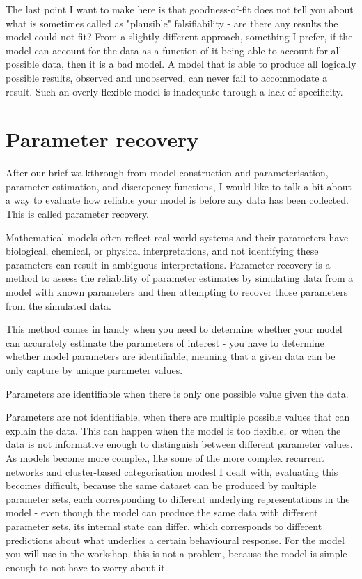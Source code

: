 \documentclass[12pt]{article}
\begin{document}
The last point I want to make here is that goodness-of-fit does not tell you about what is sometimes called as "plausible" falsifiability - are there any results the model could not fit? From a slightly different approach, something I prefer, if the model can account for the data as a function of it being able to account for all possible data, then it is a bad model. A model that is able to produce all logically possible results, observed and unobserved, can never fail to accommodate a result. Such an overly flexible model is inadequate through a lack of specificity.

\section{Parameter recovery}

After our brief walkthrough from model construction and parameterisation, parameter estimation, and discrepency functions, I would like to talk a bit about a way to evaluate how reliable your model is before any data has been collected. This is called parameter recovery.

Mathematical models often reflect real-world systems and their parameters have biological, chemical, or physical interpretations, and not identifying these parameters can result in ambiguous interpretations. Parameter recovery is a method to assess the reliability of parameter estimates by simulating data from a model with known parameters and then attempting to recover those parameters from the simulated data.

This method comes in handy when you need to determine whether your model can accurately estimate the parameters of interest - you have to determine whether model parameters are identifiable, meaning that a given data can be only capture by unique parameter values.

Parameters are identifiable when there is only one possible value given the data.

Parameters are not identifiable, when there are multiple possible values that can explain the data. This can happen when the model is too flexible, or when the data is not informative enough to distinguish between different parameter values. As models become more complex, like some of the more complex recurrent networks and cluster-based categorisation modesl I dealt with, evaluating this becomes difficult, because the same dataset can be produced by multiple parameter sets, each corresponding to different underlying representations in the model - even though the model can produce the same data with different parameter sets, its internal state can differ, which corresponds to different predictions about what underlies a certain behavioural response. For the model you will use in the workshop, this is not a problem, because the model is simple enough to not have to worry about it.
\end{document}
